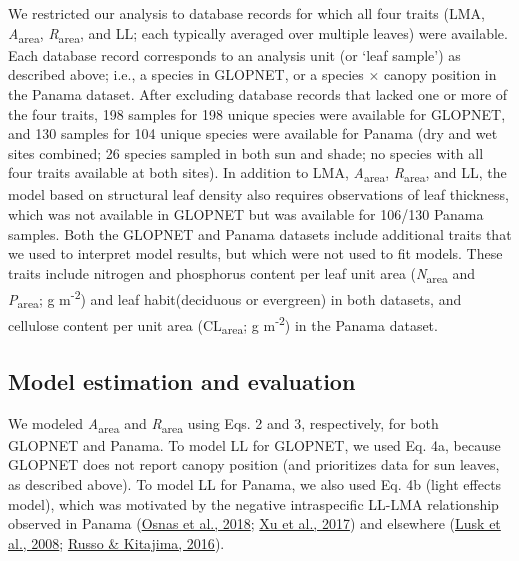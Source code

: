 \documentclass[
  12pt,
  letterpaper,
  DIV=11,
  numbers=noendperiod]{scrartcl}
\begin{document}
We restricted our analysis to database records for which all four traits
(LMA, \emph{A}\textsubscript{area}, \emph{R}\textsubscript{area}, and
LL; each typically averaged over multiple leaves) were available. Each
database record corresponds to an analysis unit (or `leaf sample') as
described above; i.e., a species in GLOPNET, or a species \(\times\)
canopy position in the Panama dataset. After excluding database records
that lacked one or more of the four traits, 198 samples for 198 unique
species were available for GLOPNET, and 130 samples for 104 unique
species were available for Panama (dry and wet sites combined; 26
species sampled in both sun and shade; no species with all four traits
available at both sites). In addition to LMA,
\emph{A}\textsubscript{area}, \emph{R}\textsubscript{area}, and LL, the
model based on structural leaf density also requires observations of
leaf thickness, which was not available in GLOPNET but was available for
106/130 Panama samples. Both the GLOPNET and Panama datasets include
additional traits that we used to interpret model results, but which
were not used to fit models. These traits include nitrogen and
phosphorus content per leaf unit area (\emph{N}\textsubscript{area} and
\emph{P}\textsubscript{area}; g m\textsuperscript{-2}) and leaf
habit(deciduous or evergreen) in both datasets, and cellulose content
per unit area (CL\textsubscript{area}; g m\textsuperscript{-2}) in the
Panama dataset.

\hypertarget{model-estimation-and-evaluation}{%
\subsection{Model estimation and
evaluation}\label{model-estimation-and-evaluation}}

We modeled \emph{A}\textsubscript{area} and \emph{R}\textsubscript{area}
using Eqs. 2 and 3, respectively, for both GLOPNET and Panama. To model
LL for GLOPNET, we used Eq. 4a, because GLOPNET does not report canopy
position (and prioritizes data for sun leaves, as described above). To
model LL for Panama, we also used Eq. 4b (light effects model), which
was motivated by the negative intraspecific LL-LMA relationship observed
in Panama (\protect\hyperlink{ref-Osnas2018}{Osnas et al., 2018};
\protect\hyperlink{ref-Xu2017}{Xu et al., 2017}) and elsewhere
(\protect\hyperlink{ref-Lusk2008}{Lusk et al., 2008};
\protect\hyperlink{ref-Russo2016}{Russo \& Kitajima, 2016}).
\end{document}
